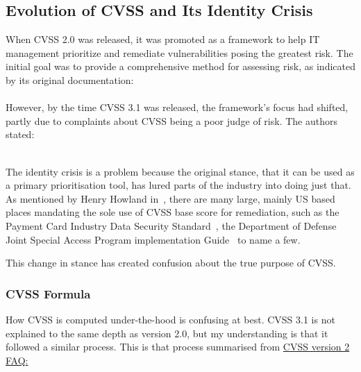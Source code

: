 \documentclass[12pt]{article}
\begin{document}
\subsection{Evolution of CVSS and Its Identity Crisis}
When CVSS 2.0 was released, it was promoted as a framework to help IT management prioritize and
remediate vulnerabilities posing the greatest risk. The initial goal was to provide a comprehensive
method for assessing risk, as indicated by its original documentation:
\\

\textit{}~\cite{CVSS_2}
\\

However, by the time CVSS 3.1 was released, the framework's focus had shifted, partly due to
complaints about CVSS being a poor judge of risk. The authors stated:

\textit{}~\cite{CVSS_31}
\\

The identity crisis is a problem because the original stance, that it can be used as a primary
prioritisation tool, has lured parts of the industry into doing just that. As mentioned by Henry
Howland in~\cite{ubiquitous}, there are many large, mainly US based places mandating the sole use of
CVSS base score for remediation, such as the Payment Card Industry Data Security Standard~\cite{PCI}, the
Department of Defense Joint Special Access Program implementation Guide~\cite{DOD} to name a few.

This change in stance has created confusion about the true purpose of CVSS.

\subsubsection{CVSS Formula}


How CVSS is computed under-the-hood is confusing at best. CVSS 3.1 is not explained to the same
depth as version 2.0, but my understanding is that it followed a similar process. This is that
process summarised from
\href{https://www.first.org/cvss/v2/faq#Explanation-of-CVSS-v2-formula-and-metric-valued-development}{CVSS
	version 2 FAQ:}~\cite{CVSS_formula}
\end{document}
